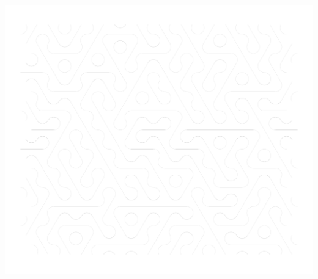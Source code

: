 \documentclass{article}%
\begin{document}
\includegraphics[width=\textwidth]{examples/output/hex-variation.pdf}
\pagebreak
\end{document}
